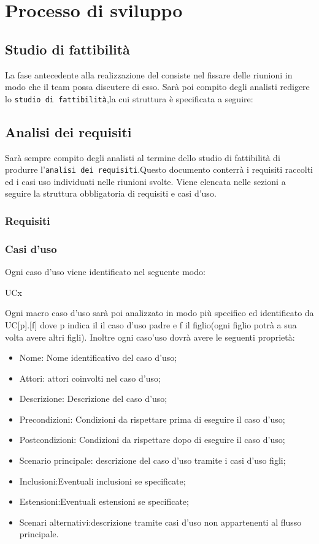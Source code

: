 \section{Processo di sviluppo}

	\subsection{Studio di fattibilità}
	La fase antecedente alla realizzazione del  consiste nel fissare delle riunioni in modo che il team possa discutere di esso. Sarà poi compito degli analisti redigere lo \texttt{studio di fattibilità},la cui struttura è specificata a seguire: %
	\subsection{Analisi dei requisiti}
	Sarà sempre compito degli analisti al termine dello studio di fattibilità di produrre l'\texttt{analisi dei requisiti}.Questo documento conterrà i requisiti raccolti ed i casi uso individuati nelle riunioni svolte.
	Viene elencata nelle sezioni a seguire la struttura obbligatoria di requisiti e casi d'uso.
		\subsubsection{Requisiti}
		\subsubsection{Casi d'uso}
		Ogni caso d'uso viene identificato nel seguente modo:
		\centerline{UCx}
		Ogni macro caso d'uso sarà poi analizzato in modo più specifico ed identificato da UC[p].[f] dove p indica il il caso d'uso padre e f il figlio(ogni figlio potrà a sua volta avere altri figli).
		Inoltre ogni caso'uso dovrà avere le seguenti proprietà:
		\begin{itemize}
		\item Nome: Nome identificativo del caso d'uso;
		\item Attori: attori coinvolti nel caso d'uso;
		\item Descrizione: Descrizione del caso d'uso;
		\item Precondizioni: Condizioni da rispettare prima di eseguire il caso d'uso;%
		\item Postcondizioni:  Condizioni da rispettare dopo di eseguire il caso d'uso;%
		\item Scenario principale: descrizione del caso d'uso tramite i casi d'uso figli;
		\item Inclusioni:Eventuali inclusioni se specificate;
		\item Estensioni:Eventuali estensioni se specificate;
		\item Scenari alternativi:descrizione tramite casi d'uso non appartenenti al flusso principale.
		\end{itemize}
